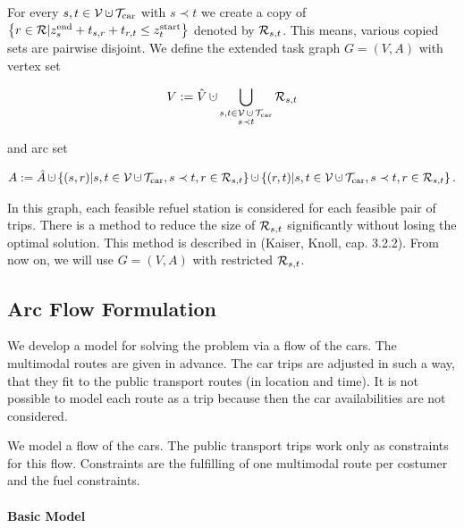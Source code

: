 \begin{definition}

For every $s,t\in \mathcal{V}\cupdot\Tcar$ with $s\prec t$ we create a copy of $\left\{r\in\mathcal{R}|z^{\operatorname{end}}_s+t_{s,r}+t_{r,t}\leq z^{\operatorname{start}}_t\right\}$ denoted by $\mathcal{R}_{s,t}$. This means, various copied sets are pairwise disjoint. We define the extended task graph $G=(V,A)$ with vertex set

\begin{align*}
	V:=\hat{V}\cupdot\Cupdot_{\substack{s,t\in\mathcal{V}\cupdot\Tcar \\ s\prec t}} \Rst
\end{align*}

and arc set

\begin{align*}
	A:=\hat{A}\cupdot\left\{(s,r)|s,t\in\mathcal{V}\cupdot\Tcar,s\prec t,r\in\Rst\right\}\cupdot\left\{(r,t)|s,t\in\mathcal{V}\cupdot\Tcar,s\prec t,r\in\Rst\right\}.
\end{align*}

In this graph, each feasible refuel station is considered for each feasible pair of trips. There is a method to reduce the size of $\mathcal{R}_{s,t}$ significantly without losing the optimal solution. This method is described in (Kaiser, Knoll, cap. 3.2.2). From now on, we will use $G=(V,A)$ with restricted $\mathcal{R}_{s,t}$.

\end{definition}


\subsection{Arc Flow Formulation}

We develop a model for solving the problem via a flow of the cars. The multimodal routes are given in advance. The car trips are adjusted in such a way, that they fit to the public transport routes (in location and time). It is not possible to model each route as a trip because then the car availabilities are not considered.

We model a flow of the cars. The public transport trips work only as constraints for this flow. Constraints are the fulfilling of one multimodal route per costumer and the fuel constraints.

\paragraph{Basic Model} \parfill

